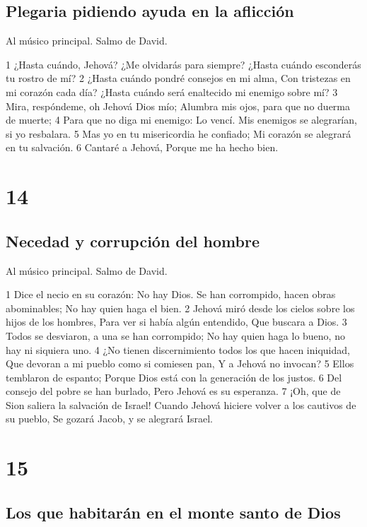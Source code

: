 \section*{Plegaria pidiendo ayuda en la aflicción}

Al músico principal. Salmo de David.

1 ¿Hasta cuándo, Jehová? ¿Me olvidarás para siempre?
¿Hasta cuándo esconderás tu rostro de mí?
2 ¿Hasta cuándo pondré consejos en mi alma,
Con tristezas en mi corazón cada día?
¿Hasta cuándo será enaltecido mi enemigo sobre mí?
3 Mira, respóndeme, oh Jehová Dios mío;
Alumbra mis ojos, para que no duerma de muerte;
4 Para que no diga mi enemigo: Lo vencí.
Mis enemigos se alegrarían, si yo resbalara.
5 Mas yo en tu misericordia he confiado;
Mi corazón se alegrará en tu salvación.
6 Cantaré a Jehová,
Porque me ha hecho bien.

\chapter{14}

\section*{Necedad y corrupción del hombre}

Al músico principal. Salmo de David.

1 Dice el necio en su corazón:
No hay Dios.
Se han corrompido, hacen obras abominables;
No hay quien haga el bien.
2 Jehová miró desde los cielos sobre los hijos de los hombres,
Para ver si había algún entendido,
Que buscara a Dios.
3 Todos se desviaron, a una se han corrompido;
No hay quien haga lo bueno, no hay ni siquiera uno.
4 ¿No tienen discernimiento todos los que hacen iniquidad,
Que devoran a mi pueblo como si comiesen pan,
Y a Jehová no invocan?
5 Ellos temblaron de espanto;
Porque Dios está con la generación de los justos.
6 Del consejo del pobre se han burlado,
Pero Jehová es su esperanza.
7 ¡Oh, que de Sion saliera la salvación de Israel!
Cuando Jehová hiciere volver a los cautivos de su pueblo,
Se gozará Jacob, y se alegrará Israel.

\chapter{15}

\section*{Los que habitarán en el monte santo de Dios}

